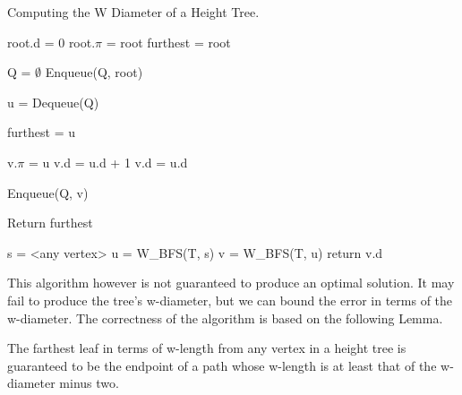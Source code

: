 \begin{algorithm}

\caption{Computing the W Diameter of a Height Tree.}

\begin{algorithmic}[1]

    \State root.d = 0
    \State root.$\pi$ = root
    \State furthest = root

    \State Q = $\emptyset$
    \State Enqueue(Q, root)

        \State u = Dequeue(Q)

            \State furthest = u
        \EndIf

                \State v.$\pi$ = u
                    \State v.d = u.d + 1
                \Else
                    \State v.d = u.d
                \EndIf

                \State Enqueue(Q, v)

            \EndIf
        \EndFor
    \EndWhile
    \State Return furthest
\EndFunction

    \State s = <any vertex>
    \State u = W\_BFS(T, s)
    \State v = W\_BFS(T, u)
    \State return v.d
\EndFunction

\end{algorithmic}
\end{algorithm}



This algorithm however is not guaranteed to produce an optimal solution. It may fail to produce the tree's w-diameter, but we can bound the error in terms of the w-diameter. The correctness of the algorithm is based on the following Lemma.

\begin{lem} The farthest leaf in terms of w-length from any vertex in a height tree is guaranteed to be the endpoint of a path whose w-length is at least that of the w-diameter minus two.
\label{lem:2xbfs-proof}
\end{lem}

